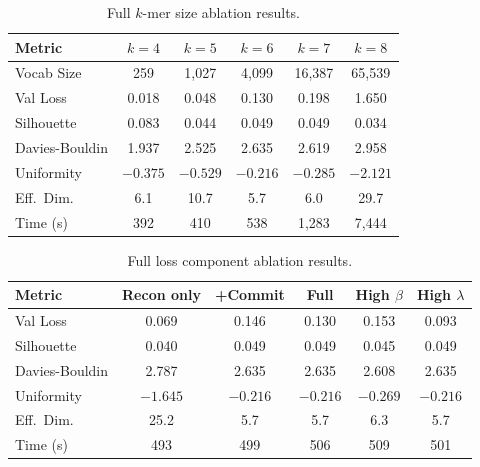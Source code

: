\documentclass[pmlr]{jmlr}%
\begin{document}
\vspace{-1ex}
\begin{table}[!ht]
\centering
\caption{Full $k$-mer size ablation results.}
\label{tab:app_kmer}
\small\setlength{\tabcolsep}{5pt}
\begin{tabular}{lccccc}
\toprule
\textbf{Metric} & $k{=}4$ & $k{=}5$ & $k{=}6$ & $k{=}7$ & $k{=}8$ \\
\midrule
Vocab Size & 259 & 1,027 & 4,099 & 16,387 & 65,539 \\
Val Loss & 0.018 & 0.048 & 0.130 & 0.198 & 1.650 \\
Silhouette & 0.083 & 0.044 & 0.049 & 0.049 & 0.034 \\
Davies-Bouldin & 1.937 & 2.525 & 2.635 & 2.619 & 2.958 \\
Uniformity & $-0.375$ & $-0.529$ & $-0.216$ & $-0.285$ & $-2.121$ \\
Eff.\ Dim. & 6.1 & 10.7 & 5.7 & 6.0 & 29.7 \\
Time (s) & 392 & 410 & 538 & 1,283 & 7,444 \\
\bottomrule
\end{tabular}
\end{table}

\vspace{-1ex}
\begin{table}[!ht]
\centering
\caption{Full loss component ablation results.}
\label{tab:app_loss}
\small\setlength{\tabcolsep}{5pt}
\begin{tabular}{lccccc}
\toprule
\textbf{Metric} & Recon only & +Commit & Full & High $\beta$ & High $\lambda$ \\
\midrule
Val Loss & 0.069 & 0.146 & 0.130 & 0.153 & 0.093 \\
Silhouette & 0.040 & 0.049 & 0.049 & 0.045 & 0.049 \\
Davies-Bouldin & 2.787 & 2.635 & 2.635 & 2.608 & 2.635 \\
Uniformity & $-1.645$ & $-0.216$ & $-0.216$ & $-0.269$ & $-0.216$ \\
Eff.\ Dim. & 25.2 & 5.7 & 5.7 & 6.3 & 5.7 \\
Time (s) & 493 & 499 & 506 & 509 & 501 \\
\bottomrule
\end{tabular}
\end{table}
\end{document}
